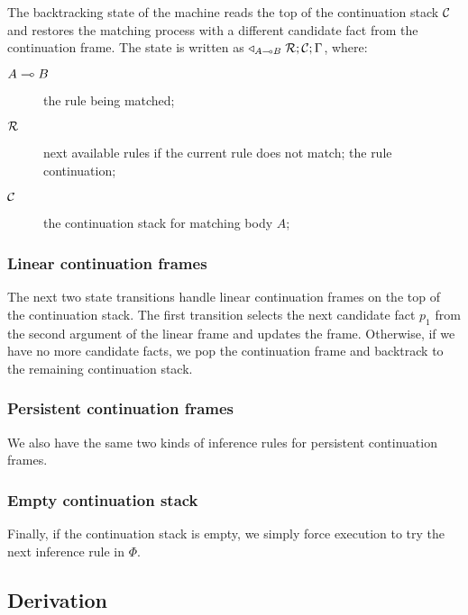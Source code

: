The backtracking state of the machine reads the top of the continuation stack
$\mathcal{C}$ and restores the matching process with a different candidate fact
from the continuation frame. The state is written as $\triangleleft_{A \multimap
B} \; \mathcal{R}; \mathcal{C}; \Gamma$, where:

\begin{description}
   \item[$A \multimap B$] the rule being matched;
   \item[$\mathcal{R}$] next available rules if the current rule does not match;
   the rule continuation;
   \item[$\mathcal{C}$] the continuation stack for matching body $A$;
\end{description}

\subsubsection{Linear continuation frames}

The next two state transitions handle linear continuation frames on the top of the
continuation stack. The first transition selects the next candidate fact $p_1$ from the
second argument of the linear frame and updates the frame. Otherwise, if we have
no more candidate facts, we pop the continuation frame and backtrack to the
remaining continuation stack.



\subsubsection{Persistent continuation frames}

We also have the same two kinds of inference rules for persistent continuation
frames.



\subsubsection{Empty continuation stack}

Finally, if the continuation stack is empty, we simply force execution to try
the next inference rule in $\Phi$.



\subsection{Derivation}

